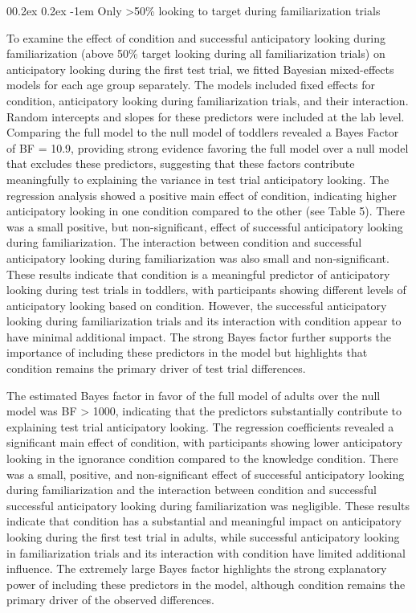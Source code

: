 \documentclass[
  man,floatsintext]{apa6}
\makeatletter
\let\oldparagraph\paragraph
\renewcommand{\paragraph}{
    \@ifstar
      \xxxParagraphStar
      \xxxParagraphNoStar
  }
\newcommand{\xxxParagraphStar}[1]{\oldparagraph*{#1}\mbox{}}
\newcommand{\xxxParagraphNoStar}[1]{\oldparagraph{#1}\mbox{}}
\renewcommand{\paragraph}{\@startsection{paragraph}{4}{\parindent}%
  {0\baselineskip \@plus 0.2ex \@minus 0.2ex}%
  {-1em}%
  {\normalfont\normalsize\bfseries\itshape\typesectitle}}
\makeatother
\begin{document}
\paragraph{Only \textgreater50\% looking to target during familiarization trials}\label{only-50-looking-to-target-during-familiarization-trials}

To examine the effect of condition and successful anticipatory looking during familiarization (above 50\% target looking during all familiarization trials) on anticipatory looking during the first test trial, we fitted Bayesian mixed-effects models for each age group separately. The models included fixed effects for condition, anticipatory looking during familiarization trials, and their interaction. Random intercepts and slopes for these predictors were included at the lab level. Comparing the full model to the null model of toddlers revealed a Bayes Factor of BF = 10.9, providing strong evidence favoring the full model over a null model that excludes these predictors, suggesting that these factors contribute meaningfully to explaining the variance in test trial anticipatory looking. The regression analysis showed a positive main effect of condition, indicating higher anticipatory looking in one condition compared to the other (see Table 5). There was a small positive, but non-significant, effect of successful anticipatory looking during familiarization. The interaction between condition and successful anticipatory looking during familiarization was also small and non-significant. These results indicate that condition is a meaningful predictor of anticipatory looking during test trials in toddlers, with participants showing different levels of anticipatory looking based on condition. However, the successful anticipatory looking during familiarization trials and its interaction with condition appear to have minimal additional impact. The strong Bayes factor further supports the importance of including these predictors in the model but highlights that condition remains the primary driver of test trial differences.

The estimated Bayes factor in favor of the full model of adults over the null model was BF \textgreater{} 1000, indicating that the predictors substantially contribute to explaining test trial anticipatory looking. The regression coefficients revealed a significant main effect of condition, with participants showing lower anticipatory looking in the ignorance condition compared to the knowledge condition. There was a small, positive, and non-significant effect of successful anticipatory looking during familiarization and the interaction between condition and successful successful anticipatory looking during familiarization was negligible. These results indicate that condition has a substantial and meaningful impact on anticipatory looking during the first test trial in adults, while successful anticipatory looking in familiarization trials and its interaction with condition have limited additional influence. The extremely large Bayes factor highlights the strong explanatory power of including these predictors in the model, although condition remains the primary driver of the observed differences.
\end{document}
